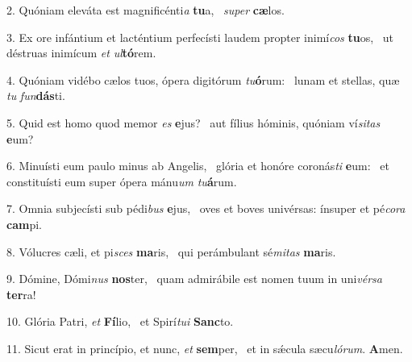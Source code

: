 2. Quóniam eleváta est magnificénti\textit{a} \textbf{tu}a, \ast\  \textit{su}\textit{per} \textbf{cæ}los.\

3. Ex ore infántium et lacténtium perfecísti laudem propter inimí\textit{cos} \textbf{tu}os, \ast\  ut déstruas inimícum \textit{et} \textit{ul}\textbf{tó}rem.\

4. Quóniam vidébo cælos tuos, ópera digitórum \textit{tu}\textbf{ó}rum: \ast\  lunam et stellas, quæ \textit{tu} \textit{fun}\textbf{dás}ti.\

5. Quid est homo quod memor \textit{es} \textbf{e}jus? \ast\  aut fílius hóminis, quóniam ví\textit{si}\textit{tas} \textbf{e}um?\

6. Minuísti eum paulo minus ab Angelis, \dag\  glória et honóre coronás\textit{ti} \textbf{e}um: \ast\  et constituísti eum super ópera mánu\textit{um} \textit{tu}\textbf{á}rum.\

7. Omnia subjecísti sub pédi\textit{bus} \textbf{e}jus, \ast\  oves et boves univérsas: ínsuper et pé\textit{co}\textit{ra} \textbf{cam}pi.\

8. Vólucres cæli, et pi\textit{sces} \textbf{ma}ris, \ast\  qui perámbulant sé\textit{mi}\textit{tas} \textbf{ma}ris.\

9. Dómine, Dómi\textit{nus} \textbf{nos}ter, \ast\  quam admirábile est nomen tuum in uni\textit{vér}\textit{sa} \textbf{ter}ra!\

10. Glória Patri, \textit{et} \textbf{Fí}lio, \ast\  et Spirí\textit{tu}\textit{i} \textbf{Sanc}to.\

11. Sicut erat in princípio, et nunc, \textit{et} \textbf{sem}per, \ast\  et in sǽcula sæcu\textit{ló}\textit{rum}. \textbf{A}men.\

